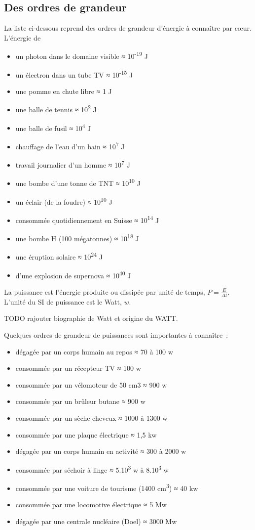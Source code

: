 \subsection{Des ordres de grandeur }
La liste ci-dessous reprend des ordres de grandeur d'énergie à connaître par cœur.
L'énergie de
\begin{itemize}
  \item un photon dans le domaine visible ≈ 10\textsuperscript{-19}
J
  \item un électron dans un tube TV ≈ 10\textsuperscript{-15 }J
  \item une pomme en chute libre ≈ 1 J
  \item une balle de tennis ≈ 10\textsuperscript{2} J
  \item une balle de fusil ≈ 10\textsuperscript{4} J
  \item chauffage de l'eau d'un bain ≈ 10\textsuperscript{7} J
  \item travail journalier d'un homme ≈ 10\textsuperscript{7} J
  \item une bombe d'une tonne de TNT ≈ 10\textsuperscript{10} J
  \item un éclair (de la foudre) ≈ 10\textsuperscript{10 }J
  \item consommée quotidiennement en Suisse ≈ 10\textsuperscript{14} J
  \item une bombe H (100 mégatonnes) ≈ 10\textsuperscript{18 }J
  \item une éruption solaire ≈ 10\textsuperscript{24} J
  \item d'une explosion de supernova ≈ 10\textsuperscript{40} J
\end{itemize}

La puissance est l'énergie produite ou dissipée par unité de temps, $P = \frac{E}{\Delta t}$. 
L'unité du SI de puissance est le Watt, $\si{w}$. 

TODO rajouter biographie de Watt et origine du WATT.

Quelques ordres de grandeur de puissances sont importantes à connaître~:
\begin{itemize}
  \item  dégagée par un corps humain au repos ≈ 70 à 100 w
  \item  consommée par un récepteur TV ≈ 100 w
  \item  consommée par un vélomoteur de 50 cm3 ≈ 900 w
  \item  consommée par un brûleur butane ≈ 900 w
  \item  consommée par un sèche-cheveux ≈ 1000 à 1300 w
  \item  consommée par une plaque électrique ≈ 1,5 kw
  \item  dégagée par un corps humain en activité ≈ 300 à 2000 w
  \item  consommée par séchoir à linge ≈ 5.10\textsuperscript{3} w à
8.10\textsuperscript{3} w
  \item  consommée par une voiture de tourisme (1400
cm\textsuperscript{3}) ≈ 40 kw
  \item  consommée par une locomotive électrique ≈ 5 Mw
  \item  dégagée par une centrale nucléaire (Doel) ≈ 3000 Mw
\end{itemize}



